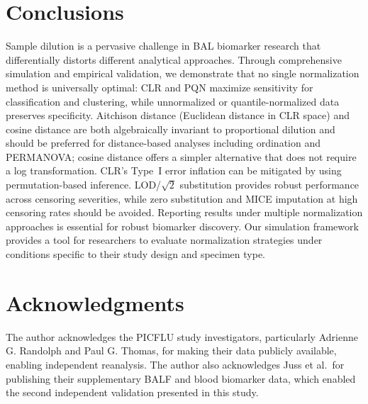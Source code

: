 \documentclass[12pt]{article}
\begin{document}
\section{Conclusions}

Sample dilution is a pervasive challenge in BAL biomarker research that differentially distorts different analytical approaches. Through comprehensive simulation and empirical validation, we demonstrate that no single normalization method is universally optimal: CLR and PQN maximize sensitivity for classification and clustering, while unnormalized or quantile-normalized data preserves specificity. Aitchison distance (Euclidean distance in CLR space) and cosine distance are both algebraically invariant to proportional dilution and should be preferred for distance-based analyses including ordination and PERMANOVA; cosine distance offers a simpler alternative that does not require a log transformation. CLR's Type~I error inflation can be mitigated by using permutation-based inference. LOD/$\sqrt{2}$ substitution provides robust performance across censoring severities, while zero substitution and MICE imputation at high censoring rates should be avoided. Reporting results under multiple normalization approaches is essential for robust biomarker discovery. Our simulation framework provides a tool for researchers to evaluate normalization strategies under conditions specific to their study design and specimen type.

\section*{Acknowledgments}

The author acknowledges the PICFLU study investigators, particularly Adrienne G. Randolph and Paul G. Thomas, for making their data publicly available, enabling independent reanalysis. The author also acknowledges Juss et al.\ for publishing their supplementary BALF and blood biomarker data, which enabled the second independent validation presented in this study.



\end{document}
